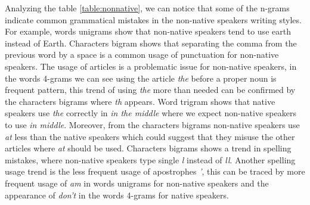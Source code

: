 \documentclass[10pt,a5paper,twoside]{article}
\begin{document}
Analyzing the table \ref{table:nonnative}, we can notice that some of the n-grams
indicate common grammatical mistakes in the non-native speakers writing styles.
For example, words unigrams show that non-native speakers tend to use earth
instead of Earth. Characters bigram shows that separating the comma from the
previous word by a space is a common usage of punctuation for non-native speakers.
The usage of articles is a problematic issue for non-native speakers, in the
words 4-grams we can see using the article \emph{the} before a proper noun is
frequent pattern, this trend of using \emph{the} more than needed can be confirmed by the characters bigrams where \emph{th} appears. Word trigram shows that native speakers use \emph{the} correctly in \emph{in the middle} where we expect non-native speakers to use \emph{in middle}.
Moreover, from the characters bigrams non-native speakers use \emph{at} less
than the native speakers which could suggest that they misuse the other articles
where \emph{at} should be used. Characters bigrams shows a trend in spelling
mistakes, where non-native speakers type single \emph{l} instead of \emph{ll}.
Another spelling usage trend is the less frequent usage of apostrophes \emph{'},
this can be traced by more frequent usage of \emph{am} in words unigrams for non-native speakers and the appearance of \emph{don't} in the words 4-grams for native speakers.
\end{document}
